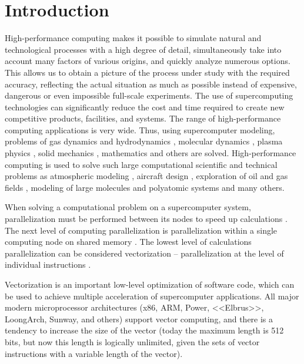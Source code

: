 \documentclass[
11pt,%
tightenlines,%
twoside,%
onecolumn,%
nofloats,%
nobibnotes,%
nofootinbib,%
superscriptaddress,%
noshowpacs,%
centertags]%
{revtex4}
\begin{document}


\maketitle


\section{Introduction}

High-performance computing makes it possible to simulate natural and technological processes with a high degree of detail, simultaneously take into account many factors of various origins, and quickly analyze numerous options.
This allows us to obtain a picture of the process under study with the required accuracy, reflecting the actual situation as much as possible instead of expensive, dangerous or even impossible full-scale experiments.
The use of supercomputing technologies can significantly reduce the cost and time required to create new competitive products, facilities, and systems.
The range of high-performance computing applications is very wide.
Thus, using supercomputer modeling, problems of gas dynamics and hydrodynamics \cite{01Smirnov}, molecular dynamics \cite{02Guo}, plasma physics \cite{03Asch}, solid mechanics \cite{04Morgan}, mathematics \cite{05Lohiya} and others are solved.
High-performance computing is used to solve such large computational scientific and technical problems as atmospheric modeling \cite{06Kang}, aircraft design \cite{07Morad}, exploration of oil and gas fields \cite{08Eremin}, modeling of large molecules and polyatomic systems \cite{09Yan} and many others.

When solving a computational problem on a supercomputer system, parallelization must be performed between its nodes to speed up calculations \cite{10Voevodin}.
The next level of computing parallelization is parallelization within a single computing node on shared memory \cite{11Zhou}.
The lowest level of calculations parallelization can be considered vectorization -- parallelization at the level of individual instructions \cite{12Feng}.

Vectorization is an important low-level optimization of software code, which can be used to achieve multiple acceleration of supercomputer applications.
All major modern microprocessor architectures (x86, ARM, Power, <<Elbrus>>, LoongArch, Sunway, and others) support vector computing, and there is a tendency to increase the size of the vector (today the maximum length is 512 bits, but now this length is logically unlimited, given the sets of vector instructions with a variable length of the vector).
\end{document}
